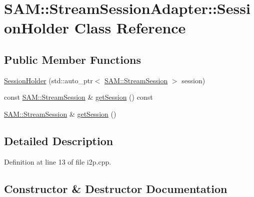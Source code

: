 \hypertarget{class_s_a_m_1_1_stream_session_adapter_1_1_session_holder}{}\section{S\+A\+M\+:\+:Stream\+Session\+Adapter\+:\+:Session\+Holder Class Reference}
\label{class_s_a_m_1_1_stream_session_adapter_1_1_session_holder}
\subsection*{Public Member Functions}
\begin{DoxyCompactItemize}
\item 
\hyperlink{class_s_a_m_1_1_stream_session_adapter_1_1_session_holder_ae1e2a6ccc998b0593900a760d4fee71e}{Session\+Holder} (std\+::auto\+\_\+ptr$<$ \hyperlink{class_s_a_m_1_1_stream_session}{S\+A\+M\+::\+Stream\+Session} $>$ session)
\item 
const \hyperlink{class_s_a_m_1_1_stream_session}{S\+A\+M\+::\+Stream\+Session} \& \hyperlink{class_s_a_m_1_1_stream_session_adapter_1_1_session_holder_abfe42c992695ab920cdc947a5f7207e5}{get\+Session} () const 
\item 
\hyperlink{class_s_a_m_1_1_stream_session}{S\+A\+M\+::\+Stream\+Session} \& \hyperlink{class_s_a_m_1_1_stream_session_adapter_1_1_session_holder_a1fc3997d4d2eebb27b6103def34baec0}{get\+Session} ()
\end{DoxyCompactItemize}


\subsection{Detailed Description}


Definition at line 13 of file i2p.\+cpp.



\subsection{Constructor \& Destructor Documentation}
\hypertarget{class_s_a_m_1_1_stream_session_adapter_1_1_session_holder_ae1e2a6ccc998b0593900a760d4fee71e}{}
